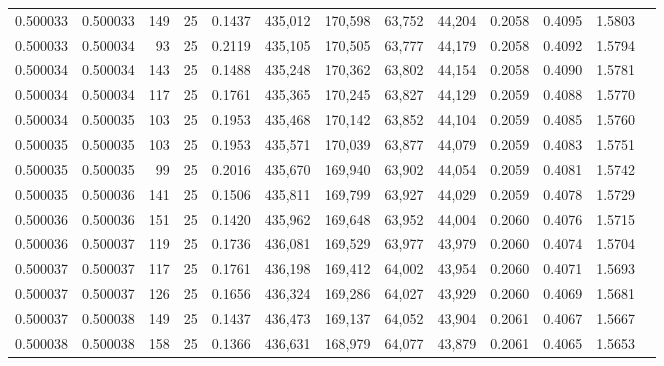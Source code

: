 \begin{tabular}{rrrrrrrrrrrrr}
0.500033 & 0.500033 & 149 &  25 &                                     0.1437 & 435,012 & 170,598 &  63,752 &  44,204 & 0.2058 & 0.4095 & 1.5803 \\
0.500033 & 0.500034 &  93 &  25 &                                     0.2119 & 435,105 & 170,505 &  63,777 &  44,179 & 0.2058 & 0.4092 & 1.5794 \\
0.500034 & 0.500034 & 143 &  25 &                                     0.1488 & 435,248 & 170,362 &  63,802 &  44,154 & 0.2058 & 0.4090 & 1.5781 \\
0.500034 & 0.500034 & 117 &  25 &                                     0.1761 & 435,365 & 170,245 &  63,827 &  44,129 & 0.2059 & 0.4088 & 1.5770 \\
0.500034 & 0.500035 & 103 &  25 &                                     0.1953 & 435,468 & 170,142 &  63,852 &  44,104 & 0.2059 & 0.4085 & 1.5760 \\
0.500035 & 0.500035 & 103 &  25 &                                     0.1953 & 435,571 & 170,039 &  63,877 &  44,079 & 0.2059 & 0.4083 & 1.5751 \\
0.500035 & 0.500035 &  99 &  25 &                                     0.2016 & 435,670 & 169,940 &  63,902 &  44,054 & 0.2059 & 0.4081 & 1.5742 \\
0.500035 & 0.500036 & 141 &  25 &                                     0.1506 & 435,811 & 169,799 &  63,927 &  44,029 & 0.2059 & 0.4078 & 1.5729 \\
0.500036 & 0.500036 & 151 &  25 &                                     0.1420 & 435,962 & 169,648 &  63,952 &  44,004 & 0.2060 & 0.4076 & 1.5715 \\
0.500036 & 0.500037 & 119 &  25 &                                     0.1736 & 436,081 & 169,529 &  63,977 &  43,979 & 0.2060 & 0.4074 & 1.5704 \\
0.500037 & 0.500037 & 117 &  25 &                                     0.1761 & 436,198 & 169,412 &  64,002 &  43,954 & 0.2060 & 0.4071 & 1.5693 \\
0.500037 & 0.500037 & 126 &  25 &                                     0.1656 & 436,324 & 169,286 &  64,027 &  43,929 & 0.2060 & 0.4069 & 1.5681 \\
0.500037 & 0.500038 & 149 &  25 &                                     0.1437 & 436,473 & 169,137 &  64,052 &  43,904 & 0.2061 & 0.4067 & 1.5667 \\
0.500038 & 0.500038 & 158 &  25 &                                     0.1366 & 436,631 & 168,979 &  64,077 &  43,879 & 0.2061 & 0.4065 & 1.5653 \\

\end{tabular}
